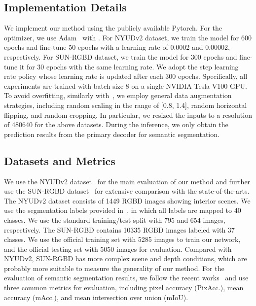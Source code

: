 \documentclass[10pt,twocolumn,letterpaper]{article}
\begin{document}
\subsection{Implementation Details}\label{sec:details}
We implement our method using the publicly available Pytorch. For the optimizer, we use Adam~\cite{Kingma:arXiv14} with . For NYUDv2 dataset, we train the model for 600 epochs and fine-tune 50 epochs with a learning rate of 0.0002 and 0.00002, respectively. For SUN-RGBD dataset, we train the model for 300 epochs and fine-tune it for 30 epochs with the same learning rate. We adopt the step learning rate policy whose learning rate is updated after each 300 epochs. Specifically, all experiments are trained with batch size 8 on a single NVIDIA Tesla V100 GPU. To avoid overfitting, similarly with~\cite{Chen:ECCV20,Ding:TIP20,Lin:TPAMI20}, we employ general data augmentation strategies, including random scaling in the range of [0.8, 1.4], random horizontal flipping, and random cropping. In particular, we resized the inputs to a resolution of 480640 for the above datasets. During the inference, we only obtain the prediction results from the primary decoder for semantic segmentation.

\subsection{Datasets and Metrics}
We use the NYUDv2 dataset~\cite{Silberman:ECCV12} for the main evaluation of our method and further use the SUN-RGBD dataset~\cite{Song:CVPR15} for extensive comparison with the state-of-the-arts. The NYUDv2 dataset consists of 1449 RGBD images showing interior scenes. We use the segmentation labels provided in~\cite{Saurabh:CVPR13}, in which all labels are mapped to 40 classes. We use the standard training/test split with 795 and 654 images, respectively. The SUN-RGBD contains 10335 RGBD images labeled with 37 classes. We use the official training set with 5285 images to train our network, and the official testing set with 5050 images for evaluation. Compared with NYUDv2, SUN-RGBD has more complex scene and depth conditions, which are probably more suitable to measure the generality of our method. For the evaluation of semantic segmentation results, we follow the recent works~\cite{Chen:ECCV20,Ding:TIP20,Lin:TPAMI20,Zhang:CVPR19,Zhou:CVPR20} and use three common metrics for evaluation, including pixel accuracy (PixAcc.), mean accuracy (mAcc.), and mean intersection over union (mIoU).
\end{document}
